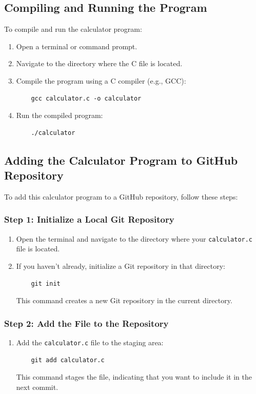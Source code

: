 \documentclass{article}
\begin{document}
\subsection{Compiling and Running the Program}
To compile and run the calculator program:
\begin{enumerate}
    \item Open a terminal or command prompt.
    \item Navigate to the directory where the C file is located.
    \item Compile the program using a C compiler (e.g., GCC):
    \begin{verbatim}
    gcc calculator.c -o calculator
    \end{verbatim}
    \item Run the compiled program:
    \begin{verbatim}
    ./calculator
    \end{verbatim}
\end{enumerate}

\subsection{Adding the Calculator Program to GitHub Repository}
To add this calculator program to a GitHub repository, follow these steps:

\subsubsection{Step 1: Initialize a Local Git Repository}
\begin{enumerate}
    \item Open the terminal and navigate to the directory where your \texttt{calculator.c} file is located.
    \item If you haven't already, initialize a Git repository in that directory:
    \begin{verbatim}
    git init
    \end{verbatim}
    This command creates a new Git repository in the current directory.
\end{enumerate}

\subsubsection{Step 2: Add the File to the Repository}
\begin{enumerate}
    \item Add the \texttt{calculator.c} file to the staging area:
    \begin{verbatim}
    git add calculator.c
    \end{verbatim}
    This command stages the file, indicating that you want to include it in the next commit.
\end{enumerate}
\end{document}
